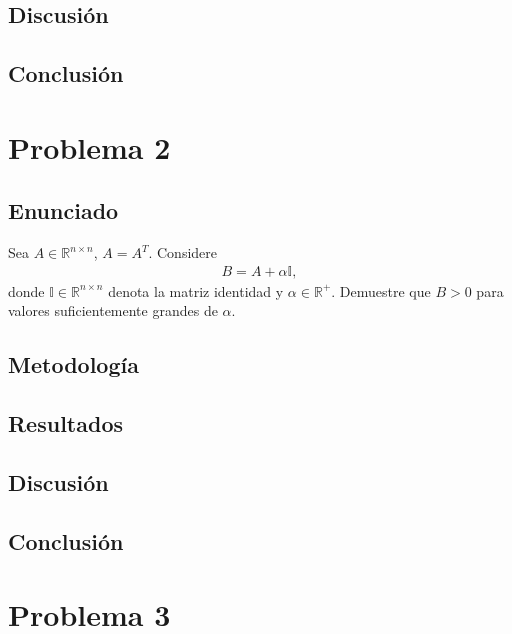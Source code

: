\documentclass{article}
\begin{document}
\subsection{Discusión}

\subsection{Conclusión}

\section{Problema 2}

\subsection{Enunciado}
Sea $A \in \mathbb{R}^{n \times n}$, $A = A^T$. Considere  
\begin{align*}
    B = A + \alpha \mathbb{I},
\end{align*}
donde $\mathbb{I} \in \mathbb{R}^{n \times n}$ denota la matriz identidad y $\alpha \in \mathbb{R}^{+}$. Demuestre que $B > 0$ para valores suficientemente grandes de $\alpha$.

\subsection{Metodología}

\subsection{Resultados}
\setcounter{equation}{0}

\subsection{Discusión}

\subsection{Conclusión}

\section{Problema 3}
\end{document}
